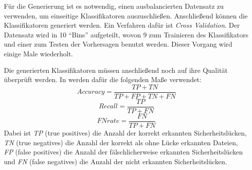 Für die Generierung ist es notwendig, einen ausbalancierten Datensatz zu verwenden, um einseitige Klassifikatoren auszuschließen.
Anschließend können die Klassifikatoren generiert werden.
Ein Verfahren dafür ist \emph{Cross Validation}\cite{chowdhury_zulkernine_2009}.
Der Datensatz wird in 10 "`Bins"' aufgeteilt, wovon 9 zum Trainieren des Klassifikators und einer zum Testen der Vorhersagen benutzt werden.
Dieser Vorgang wird einige Male wiederholt.

Die generierten Klassifikatoren müssen anschließend noch auf ihre Qualität überprüft werden.
In \cite{chowdhury_zulkernine_2009} werden dafür die folgenden Maße verwendet:
\begin{equation}
	Accuracy = \frac{TP+TN}{TP+FP+TN+FN}
\end{equation}
\begin{equation}
	Recall = \frac{TP}{TP+FN}
\end{equation}
\begin{equation}
	FN rate = \frac{FN}{TP+FN}
\end{equation}
Dabei ist \emph{TP} (true positives) die Anzahl der korrekt erkannten Sicherheitslücken,
\emph{TN} (true negatives) die Anzahl der korrekt als ohne Lücke erkannten Dateien,
\emph{FP} (false positives) die Anzahl der fälschlicherweise erkannten Sicherheitslücken und
\emph{FN} (false negatives) die Anzahl der nicht erkannten Sicherheitslücken.
